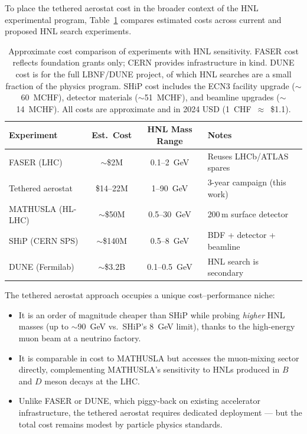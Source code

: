 \documentclass[11pt]{article}
\begin{document}
To place the tethered aerostat cost in the broader context of the HNL
experimental program, Table~\ref{tab:hnl_cost} compares estimated costs
across current and proposed HNL search experiments.

\begin{table}[h]
\centering
\small
\begin{tabular}{lccl}
\toprule
\textbf{Experiment} & \textbf{Est.\ Cost} & \textbf{HNL Mass Range} &
\textbf{Notes} \\
\midrule
FASER (LHC)   & $\sim$\$2M   & 0.1--2~GeV &
  Reuses LHCb/ATLAS spares~\cite{FASER} \\
Tethered aerostat  & \$14--22M & 1--90~GeV &
  3-year campaign (this work) \\
MATHUSLA (HL-LHC)  & $\sim$\$50M  & 0.5--30~GeV &
  200\,m surface detector~\cite{MATHUSLA} \\
SHiP (CERN SPS)    & $\sim$\$140M & 0.5--8~GeV &
  BDF + detector + beamline~\cite{SHiP-ECN3} \\
DUNE (Fermilab)    & $\sim$\$3.2B  & 0.1--0.5~GeV &
  HNL search is secondary~\cite{DUNE} \\
\bottomrule
\end{tabular}
\caption{Approximate cost comparison of experiments with HNL sensitivity.
FASER cost reflects foundation grants only; CERN provides
infrastructure in kind.  DUNE cost is for the full LBNF/DUNE project,
of which HNL searches are a small fraction of the physics program.
SHiP cost includes the ECN3 facility upgrade ($\sim$60~MCHF),
detector materials ($\sim$51~MCHF), and beamline upgrades
($\sim$14~MCHF).  All costs are approximate and in 2024 USD
(1~CHF~$\approx$~\$1.1).}
\label{tab:hnl_cost}
\end{table}

The tethered aerostat approach occupies a unique cost--performance niche:
\begin{itemize}[nosep]
  \item It is an order of magnitude cheaper than SHiP while probing
        \emph{higher} HNL masses (up to $\sim$90~GeV vs.\ SHiP's 8~GeV
        limit), thanks to the high-energy muon beam at a neutrino factory.
  \item It is comparable in cost to MATHUSLA but accesses the
        muon-mixing sector directly, complementing MATHUSLA's sensitivity
        to HNLs produced in $B$ and $D$ meson decays at the LHC.
  \item Unlike FASER or DUNE, which piggy-back on existing accelerator
        infrastructure, the tethered aerostat requires dedicated deployment
        --- but the total cost remains modest by particle physics standards.
\end{itemize}
\end{document}
